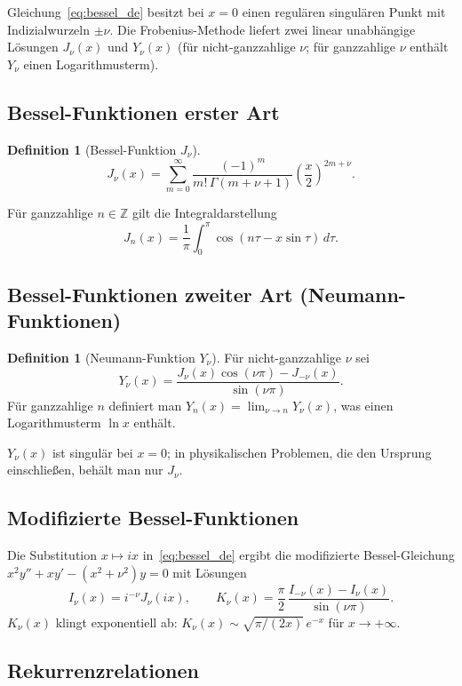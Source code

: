\documentclass[12pt,a4paper]{amsart}
\theoremstyle{definition}
\newtheorem{definition}[theorem]{Definition}
\begin{document}
Gleichung~\eqref{eq:bessel_de} besitzt bei \(x = 0\) einen regulären singulären Punkt
mit Indizialwurzeln \(\pm\nu\).  Die Frobenius-Methode liefert zwei linear unabhängige
Lösungen \(J_\nu(x)\) und \(Y_\nu(x)\) (für nicht-ganzzahlige \(\nu\); für ganzzahlige
\(\nu\) enthält \(Y_\nu\) einen Logarithmusterm).

\subsection{Bessel-Funktionen erster Art}

\begin{definition}[Bessel-Funktion \(J_\nu\)]
\[
  J_\nu(x) = \sum_{m=0}^\infty \frac{(-1)^m}{m!\,\Gamma(m+\nu+1)}
  \left(\frac{x}{2}\right)^{2m+\nu}.
\]
\end{definition}

Für ganzzahlige \(n \in \mathbb{Z}\) gilt die Integraldarstellung
\[
  J_n(x) = \frac{1}{\pi}\int_0^\pi \cos(n\tau - x\sin\tau)\,d\tau.
\]

\subsection{Bessel-Funktionen zweiter Art (Neumann-Funktionen)}

\begin{definition}[Neumann-Funktion \(Y_\nu\)]
Für nicht-ganzzahlige \(\nu\) sei
\[
  Y_\nu(x) = \frac{J_\nu(x)\cos(\nu\pi) - J_{-\nu}(x)}{\sin(\nu\pi)}.
\]
Für ganzzahlige \(n\) definiert man \(Y_n(x) = \lim_{\nu\to n} Y_\nu(x)\), was
einen Logarithmusterm \(\ln x\) enthält.
\end{definition}

\(Y_\nu(x)\) ist singulär bei \(x = 0\); in physikalischen Problemen, die den Ursprung
einschließen, behält man nur \(J_\nu\).

\subsection{Modifizierte Bessel-Funktionen}

Die Substitution \(x \mapsto ix\) in~\eqref{eq:bessel_de} ergibt die modifizierte
Bessel-Gleichung \(x^2 y'' + xy' - (x^2+\nu^2)y = 0\) mit Lösungen
\[
  I_\nu(x) = i^{-\nu}J_\nu(ix), \qquad
  K_\nu(x) = \frac{\pi}{2}\,\frac{I_{-\nu}(x)-I_\nu(x)}{\sin(\nu\pi)}.
\]
\(K_\nu(x)\) klingt exponentiell ab: \(K_\nu(x) \sim \sqrt{\pi/(2x)}\,e^{-x}\) für
\(x \to +\infty\).

\subsection{Rekurrenzrelationen}
\end{document}
